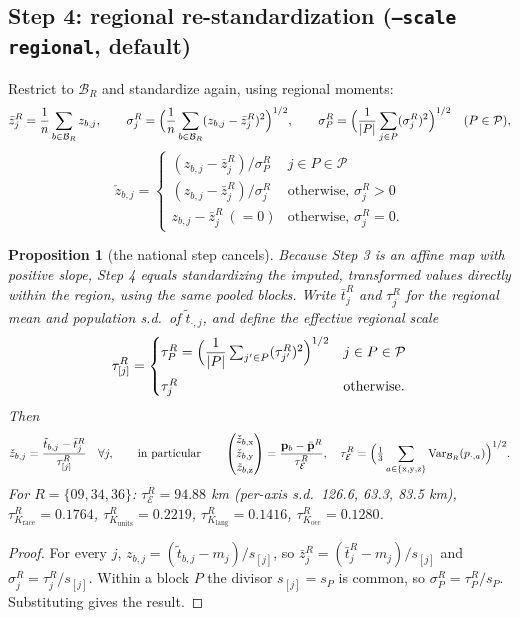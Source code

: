 \documentclass[11pt]{article}
\newcommand{\Var}{\operatorname{Var}}
\newtheorem*{prop}{Proposition}
\begin{document}
\subsection{Step 4: regional re-standardization (\texorpdfstring{\texttt{--scale regional}}{--scale regional}, default)}

Restrict to $\mathcal B_R$ and standardize again, using regional moments:
\[
\bar z^R_j=\frac1n\sum_{b\in\mathcal B_R}z_{b,j},\qquad
\sigma^R_j=\Bigl(\frac1n\sum_{b\in\mathcal B_R}(z_{b,j}-\bar z^R_j)^2\Bigr)^{1/2},\qquad
\sigma^R_P=\Bigl(\frac{1}{|P|}\sum_{j\in P}(\sigma^R_j)^2\Bigr)^{1/2}\quad(P\in\mathcal P),
\]
\[
\check z_{b,j}=\begin{cases}
(z_{b,j}-\bar z^R_j)/\sigma^R_P & j\in P\in\mathcal P\\[2pt]
(z_{b,j}-\bar z^R_j)/\sigma^R_j & \text{otherwise, }\sigma^R_j>0\\[2pt]
z_{b,j}-\bar z^R_j\ (=0) & \text{otherwise, }\sigma^R_j=0 .
\end{cases}
\]

\begin{prop}[the national step cancels]
Because Step 3 is an affine map with positive slope, Step 4 equals standardizing the imputed,
transformed values directly within the region, using the same pooled blocks. Write
$\bar t^R_j$ and $\tau^R_j$ for the regional mean and population s.d.\ of $\tilde t_{\cdot,j}$,
and define the \emph{effective regional scale}
\[
\tau^R_{[j]}=\begin{cases}
\tau^R_P=\Bigl(\dfrac{1}{|P|}\sum_{j'\in P}(\tau^R_{j'})^2\Bigr)^{1/2} & j\in P\in\mathcal P\\[10pt]
\tau^R_j & \text{otherwise.}
\end{cases}
\]
Then
\[
\check z_{b,j}=\frac{\tilde t_{b,j}-\bar t^R_j}{\tau^R_{[j]}}\quad\forall j,
\qquad\text{in particular}\qquad
\begin{pmatrix}\check z_{b,\mathrm{x}}\\\check z_{b,\mathrm{y}}\\\check z_{b,\mathrm{z}}\end{pmatrix}
=\frac{\mathbf p_b-\bar{\mathbf p}^R}{\tau^R_{\mathcal E}},\quad
\tau^R_{\mathcal E}=\Bigl(\tfrac13\sum_{a\in\{\mathrm{x,y,z}\}}\Var_{\mathcal B_R}(p_{\cdot,a})\Bigr)^{1/2}.
\]
For $R=\{09,34,36\}$: $\tau^R_{\mathcal E}=94.88$ km (per-axis s.d.\ 126.6, 63.3, 83.5 km),
$\tau^R_{K_{\text{race}}}=0.1764$, $\tau^R_{K_{\text{units}}}=0.2219$,
$\tau^R_{K_{\text{lang}}}=0.1416$, $\tau^R_{K_{\text{occ}}}=0.1280$.
\end{prop}
\begin{proof}
For every $j$, $z_{b,j}=(\tilde t_{b,j}-m_j)/s_{[j]}$, so $\bar z^R_j=(\bar t^R_j-m_j)/s_{[j]}$ and
$\sigma^R_j=\tau^R_j/s_{[j]}$. Within a block $P$ the divisor $s_{[j]}=s_P$ is common, so
$\sigma^R_P=\tau^R_P/s_P$. Substituting gives the result.
\end{proof}
\end{document}
